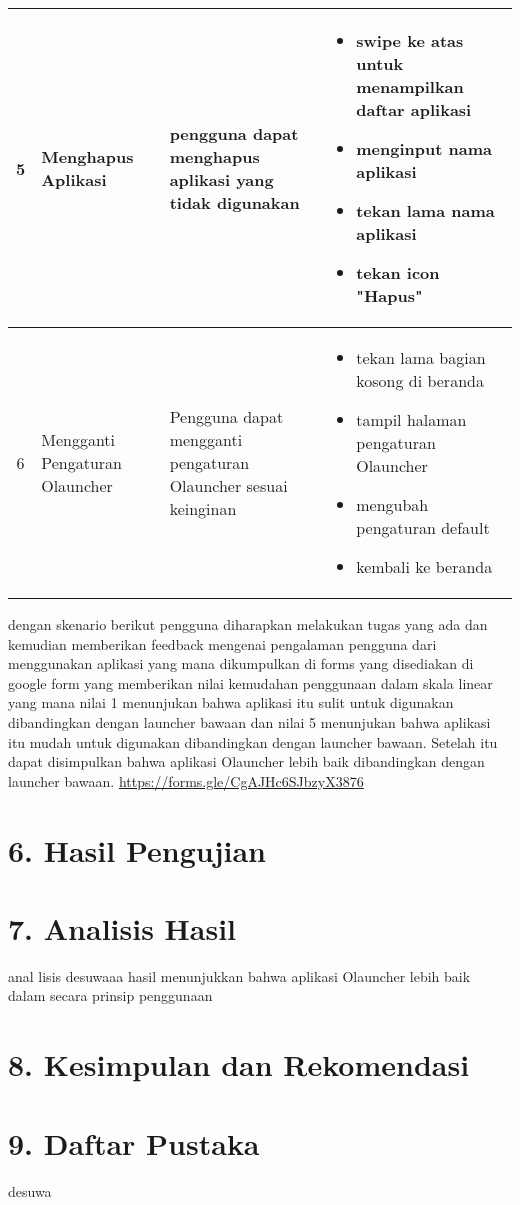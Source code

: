 \begin{table}[H]
  \begin{tabularx}{\textwidth}{|c|X|X|X|}
  \hline
  5 & Menghapus Aplikasi & pengguna dapat menghapus aplikasi yang tidak digunakan & \begin{itemize}
    \item swipe ke atas untuk menampilkan daftar aplikasi
    \item menginput nama aplikasi
    \item tekan lama nama aplikasi
    \item tekan icon "Hapus"
  \end{itemize} \\
  \hline
    6 & Mengganti Pengaturan Olauncher & Pengguna dapat mengganti pengaturan Olauncher sesuai keinginan & \begin{itemize}
      \item tekan lama bagian kosong di beranda
      \item tampil halaman pengaturan Olauncher
      \item mengubah pengaturan default
      \item kembali ke beranda
    \end{itemize} \\
  \hline
\end{tabularx}
\end{table}
dengan skenario berikut pengguna diharapkan melakukan tugas yang ada dan kemudian memberikan feedback mengenai pengalaman pengguna dari menggunakan aplikasi yang mana dikumpulkan di forms yang disediakan di google form yang memberikan nilai kemudahan penggunaan dalam skala linear yang mana nilai 1 menunjukan bahwa aplikasi itu sulit untuk digunakan dibandingkan dengan launcher bawaan dan nilai 5 menunjukan bahwa aplikasi itu mudah untuk digunakan dibandingkan dengan launcher bawaan. Setelah itu dapat disimpulkan bahwa aplikasi Olauncher lebih baik dibandingkan dengan launcher bawaan.
\url{https://forms.gle/CgAJHc6SJbzyX3876}
\section*{6. Hasil Pengujian}

\section*{7. Analisis Hasil}
anal lisis desuwaaa
hasil menunjukkan bahwa aplikasi Olauncher lebih baik dalam secara prinsip penggunaan
\section*{8. Kesimpulan dan Rekomendasi}
\section*{9. Daftar Pustaka}
desuwa
